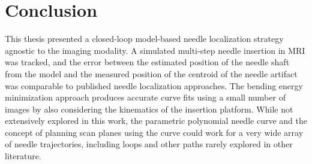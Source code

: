 \section{Conclusion}
This thesis presented a closed-loop model-based needle localization strategy agnostic to the imaging modality. A simulated multi-step needle insertion in MRI was tracked, and the error between the estimated position of the needle shaft from the model and the measured position of the centroid of the needle artifact was comparable to published needle localization approaches. The bending energy minimization approach produces accurate curve fits using a small number of  images by also considering the kinematics of the insertion platform. While not extensively explored in this work, the parametric polynomial needle curve and the concept of planning scan planes using the curve could work for a very wide array of needle trajectories, including loops and other paths rarely explored in other literature.









